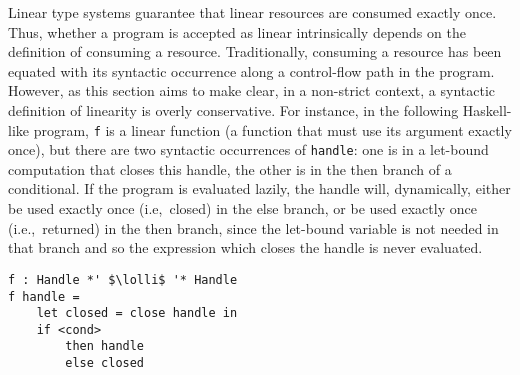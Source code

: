 \documentclass[acmsmall,review,screen]{acmart}
\newcommand{\lolli}{\multimap}
\newcommand{\ROUNDTWO}[1]{{\color{red}#1}}
\begin{document}
Linear type systems guarantee that linear resources are consumed exactly once.
\ROUNDTWO{Thus}, whether a program is \ROUNDTWO{accepted as linear} intrinsically depends on
the definition of consuming a resource.
%
\ROUNDTWO{Traditionally}, consuming a resource \ROUNDTWO{has been} equated with its 
syntactic occurrence along a control-flow path in the program. However, as this
section \ROUNDTWO{aims to} make clear, \ROUNDTWO{in a non-strict context, a
syntactic definition of linearity is overly conservative}.
%
For instance, in the following Haskell-like program, \lstinline{f} is a linear
function (a function that must use its argument
exactly once), but there are two syntactic
occurrences of \lstinline{handle}: one is in a let-bound computation that
closes this handle, the other \ROUNDTWO{is in the then branch of a
  conditional}. If the program is 
evaluated lazily, the handle will, \ROUNDTWO{dynamically, either be
  used exactly once (i.e,~closed) in
the else branch, or be used exactly once (i.e.,~returned) in the then branch}, since the 
\ROUNDTWO{let-bound variable is not needed in that branch and
so the expression which closes the handle is never evaluated}.
%
\begin{lstlisting}
f : Handle *' $\lolli$ '* Handle
f handle =
    let closed = close handle in
    if <cond>
        then handle
        else closed
\end{lstlisting}
%
%
%
%
%
%
%
%
%
%
\end{document}
